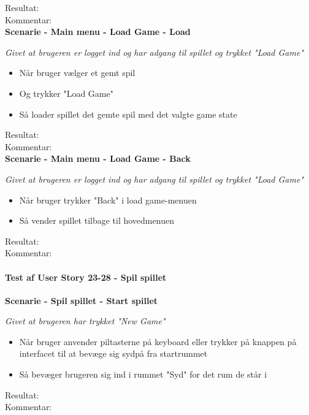 Resultat:\\
Kommentar:\\

\textbf{Scenarie - Main menu - Load Game - Load}

\textit{Givet at brugeren er logget ind og har adgang til spillet og trykket "Load Game"}

\begin{itemize}
  \item Når bruger vælger et gemt spil
  \item Og trykker "Load Game"
  \item Så loader spillet det gemte spil med det valgte game state
\end{itemize}

Resultat:\\
Kommentar:\\

\textbf{Scenarie - Main menu - Load Game - Back}

\textit{Givet at brugeren er logget ind og har adgang til spillet og trykket "Load Game"}

\begin{itemize}
  \item Når bruger trykker "Back" i load game-menuen
  \item Så vender spillet tilbage til hovedmenuen
\end{itemize}

Resultat:\\
Kommentar:\\

\paragraph{Test af User Story 23-28 - Spil spillet}

\textbf{Scenarie - Spil spillet - Start spillet}

\textit{Givet at brugeren har trykket "New Game"}

\begin{itemize}
  \item Når bruger anvender piltasterne på keyboard eller trykker på knappen på interfacet til at bevæge sig sydpå fra startrummet
  \item Så bevæger brugeren sig ind i rummet "Syd" for det rum de står i
\end{itemize}

Resultat:\\
Kommentar:\\

